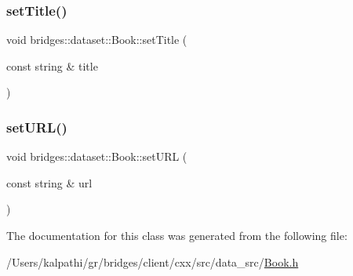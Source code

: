\mbox{\label{classbridges_1_1dataset_1_1_book_a19015494ad6a1d9c75a5c6af63be0dbf}} 
\subsubsection{\texorpdfstring{set\+Title()}{setTitle()}}
{\footnotesize\ttfamily void bridges\+::dataset\+::\+Book\+::set\+Title (\begin{DoxyParamCaption}\item[{const string \&}]{title }\end{DoxyParamCaption})\hspace{0.3cm}{\ttfamily [inline]}}

\mbox{\label{classbridges_1_1dataset_1_1_book_a4d984e8854164f18944198293759319e}} 
\subsubsection{\texorpdfstring{set\+U\+R\+L()}{setURL()}}
{\footnotesize\ttfamily void bridges\+::dataset\+::\+Book\+::set\+U\+RL (\begin{DoxyParamCaption}\item[{const string \&}]{url }\end{DoxyParamCaption})\hspace{0.3cm}{\ttfamily [inline]}}



The documentation for this class was generated from the following file\+:\begin{DoxyCompactItemize}
\item 
/\+Users/kalpathi/gr/bridges/client/cxx/src/data\+\_\+src/\mbox{\hyperlink{_book_8h}{Book.\+h}}\end{DoxyCompactItemize}

